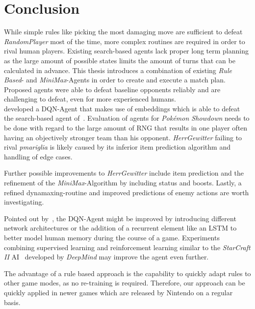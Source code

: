 
\chapter{Conclusion}
\label{ch:conclusion}
While simple rules like picking the most damaging move are sufficient to defeat 
\textit{RandomPlayer} most of the time, more complex routines are required 
in order to rival human players. Existing search-based agents lack proper long
term planning as the large amount of possible states limits the amount of turns
that can be calculated in advance. This thesis introduces a combination 
of existing \textit{Rule Based}- and \textit{MiniMax}-Agents in order to
create and execute a match plan. Proposed agents were able to defeat baseline opponents
reliably and are challenging to defeat, even for more experienced humans. \\
\cite{Huang_Lee_2019} developed a DQN-Agent that makes use of embeddings which is 
able to defeat the search-based agent of~\cite{Github:pmariglia-showdown}. 
Evaluation of agents for \textit{Pokémon Showdown} needs to be done with regard to
the large amount of \ac{RNG} that results in one player often having an objectively
stronger team than his opponent.
\textit{HerrGewitter} failing to rival \textit{pmariglia} is likely caused by its inferior
item prediction algorithm and handling of edge cases. 

Further possible improvements to \textit{HerrGewitter} include
item prediction and the refinement of the \textit{MiniMax}-Algorithm by including status
and boosts. Lastly, a refined dynamaxing-routine and improved
predictions of enemy actions are worth investigating.

Pointed out by~\cite{Huang_Lee_2019}, the DQN-Agent might be improved
by introducing \grqq different network architectures or the addition
of a recurrent element like an LSTM to better model human memory during the 
course of a game\grqq. Experiments combining supervised learning and
reinforcement learning similar to the \textit{StarCraft II} AI~\cite{OpenAI:AlphaStar}
developed by \textit{DeepMind} may improve the agent even further. 

The advantage of a rule based approach is the capability to quickly adapt rules to 
other game modes, as no re-training is required. Therefore, our approach can be 
quickly applied in newer games which are released by Nintendo on a regular basis.